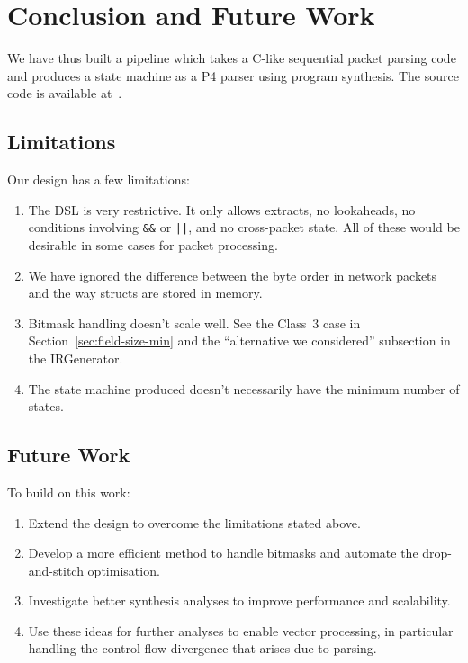\chapter{Conclusion and Future Work}
\label{ch:conclusion}

We have thus built a pipeline which takes a C-like sequential packet
parsing code and produces a state machine as a P4 parser using program
synthesis. The source code is available at~\cite{parsercompiler26_repo}.

\section{Limitations}
\label{sec:limitations}

Our design has a few limitations:
\begin{enumerate}
    \item The DSL is very restrictive. It only allows extracts,
    no lookaheads, no conditions involving \texttt{\&\&} or
    \texttt{||}, and no cross-packet state. All of these would be
    desirable in some cases for packet processing.

    \item We have ignored the difference between the byte order in
    network packets and the way structs are stored in memory.

    \item Bitmask handling doesn't scale well. See the Class~3 case
    in Section~\ref{sec:field-size-min} and the ``alternative we
    considered'' subsection in the IRGenerator.

    \item The state machine produced doesn't necessarily have the
    minimum number of states.
\end{enumerate}

\section{Future Work}

To build on this work:
\begin{enumerate}
    \item Extend the design to overcome the limitations stated above.

    \item Develop a more efficient method to handle bitmasks and automate the drop-and-stitch optimisation.
    
    \item Investigate better synthesis analyses to improve
    performance and scalability.

    \item Use these ideas for further analyses to enable vector
    processing, in particular handling the control flow divergence
    that arises due to parsing.
\end{enumerate}